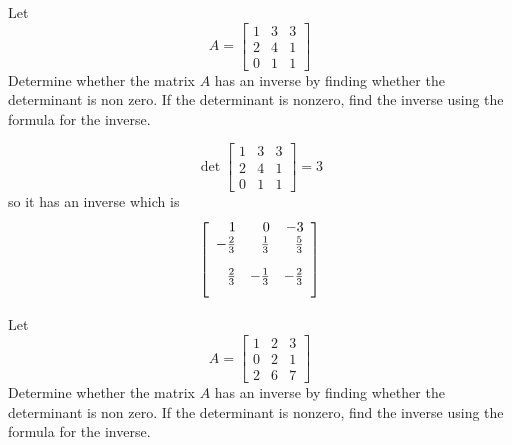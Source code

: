 \documentclass{ximera}
\begin{document}
\begin{problem}\label{prb:7.28} Let
\begin{equation*}
A=
\left[
\begin{array}{rrr}
1 & 3 & 3 \\
2 & 4 & 1 \\
0 & 1 & 1
\end{array}
\right]
\end{equation*}
Determine whether the matrix $A$ has an inverse by finding whether the
determinant is non zero. If the determinant is nonzero, find the inverse
using the formula for the inverse.
\begin{hint}
\[
\det \left[
\begin{array}{ccc}
1 & 3 & 3 \\
2 & 4 & 1 \\
0 & 1 & 1
\end{array}
\right] = 3
\]
so it has an inverse which is
\[
\left[
\begin{array}{rrr}
1 & 0 & -3 \\
-\vspace{0.05in}\frac{2}{3} & \vspace{0.05in}\frac{1}{3} & \vspace{0.05in}\frac{5}{3} \\
\vspace{0.05in}\frac{2}{3} & -\vspace{0.05in}\frac{1}{3} & -\vspace{0.05in}\frac{2}{3}
\end{array}
\right]
\]
\end{hint}
\end{problem}

\begin{problem}\label{prb:7.29} Let
\begin{equation*}
A =
\left[
\begin{array}{rrr}
1 & 2 & 3 \\
0 & 2 & 1 \\
2 & 6 & 7
\end{array}
\right]
\end{equation*}
Determine whether the matrix $A$ has an inverse by finding whether the
determinant is non zero. If the determinant is nonzero, find the inverse
using the formula for the inverse.
\end{problem}
\end{document}
